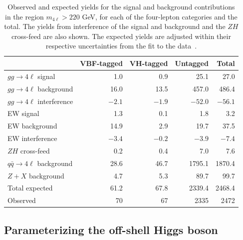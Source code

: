 \begin{table}[!hbt] 
\centering
\begin{tabular}{lrrrr}
& VBF-tagged & VH-tagged & Untagged & Total \\
\hline
$gg\to4\ell$ signal &1.0 & 0.9 & 25.1 & 27.0 \\
$gg\to4\ell$ background & 16.0 & 13.5 & 457.0& 486.4 \\
$gg\to4\ell$ interference & $-2.1$ & $-1.9$  &  $-52.0$ & $-56.1$ \\
EW signal         & 1.3 & 0.1 & 1.8& 3.2\\
EW background     & 14.9 & 2.9 & 19.7& 37.5\\
EW interference     & $-3.4$ & $-0.2$ & $-3.9$ & $-7.4$ \\
$ZH$ cross-feed & 0.2 & 0.4 & 7.0& 7.6 \\
$q\bar{q}\to4\ell$ background & 28.6 & 46.7 & 1795.1 & 1870.4  \\
$Z+X$ background & 4.7 & 5.3 & 89.7& 99.7  \\
Total expected & 61.2 & 67.8 & 2339.4 & 2468.4\\
Observed & 70 & 67 & 2335 & 2472 \\
\end{tabular}
\caption{Observed and expected yields for the \Hboson signal and background contributions 
in the \offshell region $m_{4\ell}> 220$ GeV, for each of the four-lepton categories and the total. 
The yields from interference of the signal and background and the $ZH$ cross-feed are also shown. 
The expected yields are adjusted within their respective uncertainties from the fit to the data~\cite{PhysRevD.111.092014}.}
\label{tab:templateyields_offshell}
\end{table}

\subsection{Parameterizing the off-shell Higgs boson} \label{physicsmodel}

